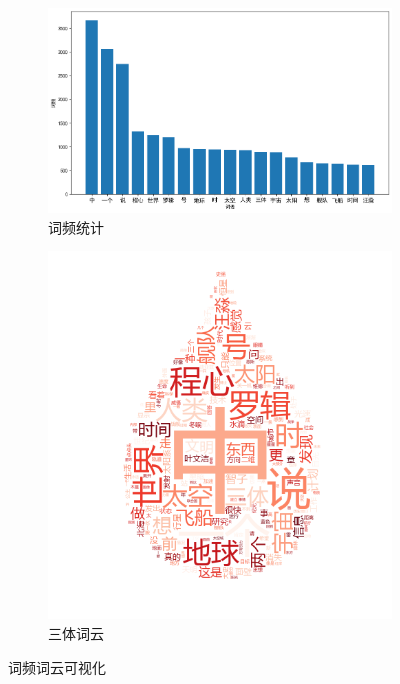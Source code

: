\documentclass[12pt]{xjtureport}
\begin{document}
\begin{figure}[htbp]
    \centering
    \begin{subfigure}[b]{0.5\textwidth}
        \centering
        \includegraphics[width=\linewidth]{figures/词频统计.png}
        \caption{词频统计}
        \label{content_count}
        \end{subfigure}
    \hspace{0.05\textwidth} %
    \begin{subfigure}[b]{0.4\textwidth}
        \centering
        \includegraphics[width=\textwidth]{figures/三体词云.png}
        \caption{三体词云}
        \label{content_wordcloud}
    \end{subfigure}
    \caption{词频词云可视化}
    \label{content_wordcloud_count}
  \end{figure}
\end{document}
